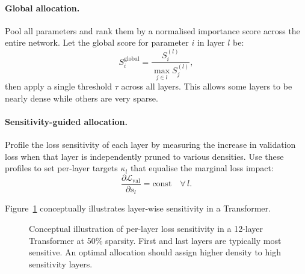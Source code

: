 \paragraph{Global allocation.} Pool all parameters and rank them by a
normalised importance score across the entire network.  Let the global
score for parameter $i$ in layer $l$ be:
\begin{equation}
	S_i^{\mathrm{global}} = \frac{S_i^{(l)}}{\max_{j \in l} S_j^{(l)}},
	\label{eq:global_score}
\end{equation}
then apply a single threshold $\tau$ across all layers.  This allows some
layers to be nearly dense while others are very sparse.

\paragraph{Sensitivity-guided allocation.}  Profile the loss sensitivity of
each layer by measuring the increase in validation loss when that layer is
independently pruned to various densities.  Use these profiles to set
per-layer targets $\kappa_l$ that equalise the marginal loss impact:
\begin{equation}
	\frac{\partial \mathcal{L}_{\mathrm{val}}}{\partial s_l}
	= \text{const} \quad \forall\,l.
	\label{eq:sensitivity}
\end{equation}

Figure~\ref{fig:layer_sensitivity} conceptually illustrates layer-wise
sensitivity in a Transformer.

\begin{figure}[H]
	\centering
	\caption{Conceptual illustration of per-layer loss sensitivity in a 12-layer
		Transformer at 50\% sparsity.  First and last layers are typically most
		sensitive.  An optimal allocation should assign higher density to high
		sensitivity layers.}
	\label{fig:layer_sensitivity}
\end{figure}

